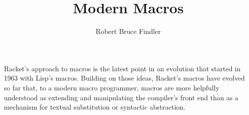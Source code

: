 \documentclass[runningheads]{llncs}
\begin{document}
\title{Modern Macros}
\author{Robert Bruce Findler}
%
\maketitle              %



Racket's approach to macros is the latest point in an evolution that
started in 1963 with Lisp's macros. Building on those ideas, Racket's
macros have evolved so far that, to a modern macro programmer, macros
are more helpfully understood as extending and manipulating the
compiler's front end than as a mechanism for textual substitution or
syntactic abstraction.
\end{document}
